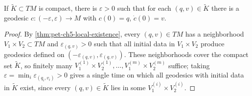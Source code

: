\begin{lemma}
  \label{lem:pet-ch5-uniform-time-existence}
  \leanok
  If $\tilde K\subset TM$ is compact, there is $\varepsilon>0$ such that for each
  $(q,v)\in\tilde K$ there is a geodesic $c:(-\varepsilon,\varepsilon)\to M$ with
  $c(0)=q$, $\dot c(0)=v$.
\end{lemma}
\begin{proof}
  By \cref{thm:pet-ch5-local-existence}, every $(q,v)\in TM$ has a neighborhood
  $V_1\times V_2\subset TM$ and $\varepsilon_{(q,v)}>0$ such that all initial data in
  $V_1\times V_2$ produce geodesics defined on $(-\varepsilon_{(q,v)},\varepsilon_{(q,v)})$.
  These neighborhoods cover the compact set $\tilde K$, so finitely many
  $V_1^{(1)}\times V_2^{(1)},\dots,V_1^{(m)}\times V_2^{(m)}$ suffice; taking
  $\varepsilon=\min_i\varepsilon_{(q_i,v_i)}>0$ gives a single time on which all geodesics
  with initial data in $\tilde K$ exist, since every $(q,v)\in\tilde K$ lies in some
  $V_1^{(i)}\times V_2^{(i)}$.
\end{proof}

